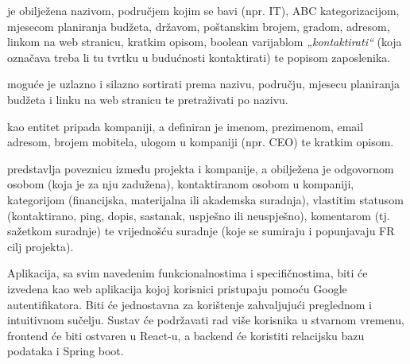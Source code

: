 		{ je obilježena nazivom, područjem kojim se bavi (npr. IT), ABC kategorizacijom, mjesecom planiranja budžeta, državom, poštanskim brojem, gradom, adresom, linkom na web stranicu, kratkim opisom, boolean varijablom \textit{„kontaktirati“} (koja označava treba li tu tvrtku u budućnosti kontaktirati) te popisom zaposlenika.}\vspace{0.1cm}
		
		{ moguće je uzlazno i silazno sortirati prema nazivu, području, mjesecu planiranja budžeta i linku na web stranicu te pretraživati po nazivu.}\vspace{0.1cm}

		{ kao entitet pripada kompaniji, a definiran je imenom, prezimenom, email adresom, brojem mobitela, ulogom u kompaniji (npr. CEO) te kratkim opisom.}\vspace{0.1cm}

		{ predstavlja poveznicu između projekta i kompanije, a obilježena je odgovornom osobom (koja je za nju zadužena), kontaktiranom osobom u kompaniji, kategorijom (financijska, materijalna ili akademska suradnja), vlastitim statusom (kontaktirano, ping, dopis, sastanak, uspješno ili neuspješno), komentarom (tj. sažetkom suradnje) te vrijednošću suradnje (koje se sumiraju i popunjavaju FR cilj projekta).}\vspace{0.3cm}

		{Aplikacija, sa svim navedenim funkcionalnostima i specifičnostima, biti će izvedena kao web aplikacija kojoj korisnici pristupaju pomoću Google autentifikatora. Biti će jednostavna za korištenje zahvaljujući preglednom i intuitivnom sučelju. Sustav će podržavati rad više korisnika u stvarnom vremenu, frontend će biti ostvaren u React-u, a backend će koristiti relacijsku bazu podataka i Spring boot.}

		\eject